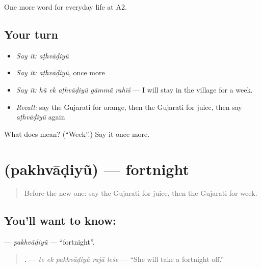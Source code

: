 \begin{grammarlens}[title={What you've built}]
One more word for everyday life at A2.
\end{grammarlens}

\subsection*{Your turn}
\begin{itemize}
\raggedright
  \item \emph{Say it:} \emph{aṭhvāḍiyũ}
  \item \emph{Say it:} \emph{aṭhvāḍiyũ}, once more
  \item \emph{Say it:} \emph{hũ ek aṭhvāḍiyũ gāmmā̃ rahīś} — I will stay in the village for a week.
  \item \emph{Recall:} say the Gujarati for orange, then the Gujarati for juice, then say \emph{aṭhvāḍiyũ} again
\end{itemize}

\begin{tcolorbox}[breakable,colback=teal!4,colframe=teal!35!black,title={Before you move on}]
What does  mean? (\textquotedblleft{}Week\textquotedblright{}.) Say it once more.
\end{tcolorbox}
\section[\texorpdfstring{\gu{પખવાડિયું} (pakhvāḍiyũ)}{પખવાડિયું (pakhvāḍiyũ)}]{ (pakhvāḍiyũ) — fortnight}

\label{lesson:GU-C173-pakhvadiyu}



\begin{quote}
Before the new one: say the Gujarati for juice, then the Gujarati for week.
\end{quote}

\subsection*{You'll want to know: }
\textbf{} — \emph{pakhvāḍiyũ} — \textquotedblleft{}fortnight\textquotedblright{}.

\begin{quote}
\textbf{    .} — \emph{te ek pakhvāḍiyũ rajā leśe} — \textquotedblleft{}She will take a fortnight off.\textquotedblright{}
\end{quote}

